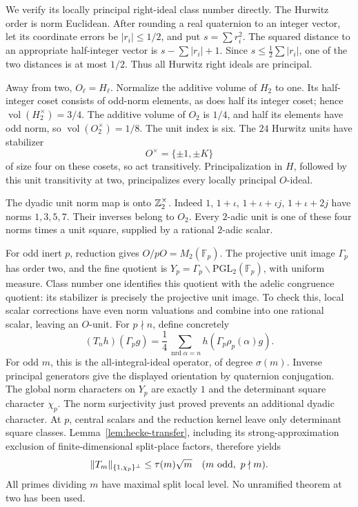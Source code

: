 We verify its locally principal right-ideal class number directly.
The Hurwitz order is norm Euclidean. After rounding a real
quaternion to an integer vector, let its coordinate errors be
\(|r_i|\le1/2\), and put \(s=\sum r_i^2\).
The squared distance to an appropriate half-integer vector is
\(s-\sum|r_i|+1\). Since \(s\le\frac12\sum|r_i|\), one of the
two distances is at most \(1/2\).
Thus all Hurwitz right ideals are principal.

Away from two, \(O_\ell=H_\ell\).
Normalize the additive volume of \(H_2\) to one.
Its half-integer coset consists of odd-norm elements, as does
half its integer coset; hence
\(\operatorname{vol}(H_2^\times)=3/4\).
The additive volume of \(O_2\) is \(1/4\), and half its elements
have odd norm, so
\(\operatorname{vol}(O_2^\times)=1/8\).
The unit index is six. The \(24\) Hurwitz units have stabilizer
\[
                    O^\times=\{\pm1,\pm K\}
\]
of size four on these cosets, so act transitively.
Principalization in \(H\), followed by this unit transitivity
at two, principalizes every locally principal \(O\)-ideal.

The dyadic unit norm map is onto \(\mathbb Z_2^\times\).
Indeed \(1\), \(1+\iota\), \(1+\iota+\iota j\),
\(1+\iota+2j\) have norms \(1,3,5,7\).
Their inverses belong to \(O_2\).
Every \(2\)-adic unit is one of these four norms times a
unit square, supplied by a rational \(2\)-adic scalar.

For odd inert \(p\), reduction gives \(O/pO=M_2(\mathbb F_p)\).
The projective unit image \(\Gamma_p\) has order two, and the
fine quotient is \(Y_p=\Gamma_p\backslash\mathrm{PGL}_2(\mathbb F_p)\),
with uniform measure. Class number one identifies this quotient
with the adelic congruence quotient: its stabilizer is precisely
the projective unit image. To check this, local scalar
corrections have even norm valuations and combine into one
rational scalar, leaving an \(O\)-unit.
For \(p\nmid n\), define concretely
\begin{equation}
 (T_nh)(\Gamma_pg)
    =\frac14\sum_{\operatorname{nrd}\alpha=n}
                             h(\Gamma_p\rho_p(\alpha)g).       \label{eq:m8-Hecke}
\end{equation}
For odd \(m\), this is the all-integral-ideal operator, of degree
\(\sigma(m)\). Inverse principal generators give the displayed
orientation by quaternion conjugation. The global norm characters
on \(Y_p\) are exactly \(1\) and the determinant square character
\(\chi_p\). The norm surjectivity just proved prevents an
additional dyadic character. At \(p\), central scalars and the
reduction kernel leave only determinant square classes.
Lemma~\ref{lem:hecke-transfer}, including its strong-approximation
exclusion of finite-dimensional split-place factors, therefore yields
\begin{equation}
             \|T_m\|_{\{1,\chi_p\}^{\perp}}
                                  \le\tau(m)\sqrt m
                  \quad(m\ {\rm odd},\ p\nmid m).             \label{eq:m8-Ramanujan}
\end{equation}
All primes dividing \(m\) have maximal split local level.
No unramified theorem at two has been used.

